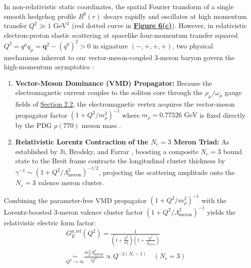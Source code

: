 \documentclass[10pt,aps,prd,twocolumn,superscriptaddress,nofootinbib,floatfix,longbibliography,showkeys]{revtex4-2}
\begin{document}
In non-relativistic static coordinates, the spatial Fourier transform of a single smooth hedgehog profile $B^0(r)$ decays rapidly and oscillates at high momentum transfer $Q^2 \gg 1\text{ GeV}^2$ (red dotted curve in \textbf{\hyperref[fig:fig6]{Figure 6(c)}}). However, in relativistic electron-proton elastic scattering at spacelike four-momentum transfer squared $Q^2 = q^\mu q_\mu = \mathbf{q}^2 - (q^0)^2 > 0$ in signature $(-,+,+,+)$, two physical mechanisms inherent to our vector-meson-coupled 3-meron baryon govern the high-momentum asymptotics \cite{ref6,ref7,ref8,ref33,ref34}:
\begin{enumerate}
  \item \textbf{Vector-Meson Dominance (VMD) Propagator:} Because the electromagnetic current couples to the soliton core through the $\rho_\mu / \omega_\mu$ gauge fields of \hyperref[sec:2.2]{Section 2.2}, the electromagnetic vertex acquires the vector-meson propagator factor $(1 + Q^2/m_\rho^2)^{-1}$ where $m_\rho = 0.77526\text{ GeV}$ is fixed directly by the PDG $\rho(770)$ meson mass \cite{ref19,ref20}.
  \item \textbf{Relativistic Lorentz Contraction of the $N_c = 3$ Meron Triad:} As established by Ji, Brodsky, and Farrar \cite{ref33,ref34}, boosting a composite $N_c = 3$ bound state to the Breit frame contracts the longitudinal cluster thickness by $\gamma^{-1} \sim (1 + Q^2/\Lambda_{\text{meron}}^2)^{-1/2}$, projecting the scattering amplitude onto the $N_c = 3$ valence meron cluster.

\end{enumerate}
Combining the parameter-free VMD propagator $(1 + Q^2/m_\rho^2)^{-1}$ with the Lorentz-boosted 3-meron valence cluster factor $(1 + Q^2/\Lambda_{\text{meron}}^2)^{-1}$ yields the relativistic electric form factor:
\begin{multline}
G_E^{p,\text{rel}}(Q^2) = \frac{1}{\left(1 + \frac{Q^2}{m_\rho^2}\right)\left(1 + \frac{Q^2}{\Lambda_{\text{meron}}^2}\right)} \\
\underset{Q^2 \to \infty}{\sim} \frac{m_\rho^2 \Lambda_{\text{meron}}^2}{Q^4} \propto Q^{-2(N_c - 1)} \quad (N_c = 3)
\end{multline}
\end{document}
